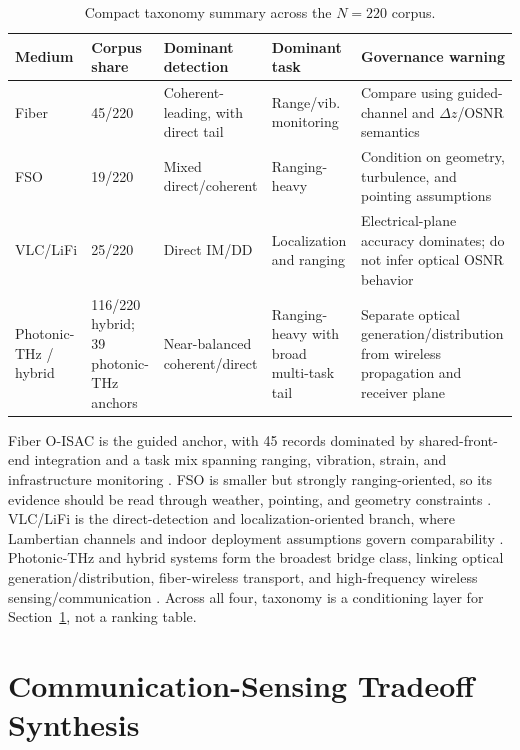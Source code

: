 \documentclass[letterpaper,journal]{IEEEtran}
\begin{document}
\begin{table}[!t]
    \caption{Compact taxonomy summary across the $N=220$ corpus.}
    \label{tab:taxonomy_compact}
    \centering
    \scriptsize
    \setlength{\tabcolsep}{2.7pt}
    \renewcommand{\arraystretch}{1.08}
    \begin{tabularx}{\textwidth}{@{}p{2.0cm}p{1.65cm}p{2.25cm}p{2.2cm}X@{}}
        \toprule
        Medium & Corpus share & Dominant detection & Dominant task & Governance warning \\
        \midrule
        Fiber & 45/220 & Coherent-leading, with direct tail & Range/vib. monitoring & Compare using guided-channel and $\Delta z$/OSNR semantics \\
        FSO & 19/220 & Mixed direct/coherent & Ranging-heavy & Condition on geometry, turbulence, and pointing assumptions \\
        VLC/LiFi & 25/220 & Direct IM/DD & Localization and ranging & Electrical-plane accuracy dominates; do not infer optical OSNR behavior \\
        Photonic-THz / hybrid & 116/220 hybrid; 39 photonic-THz anchors & Near-balanced coherent/direct & Ranging-heavy with broad multi-task tail & Separate optical generation/distribution from wireless propagation and receiver plane \\
        \bottomrule
    \end{tabularx}
\end{table}

Fiber O-ISAC is the guided anchor, with 45 records dominated by shared-front-end integration and a task mix spanning ranging, vibration, strain, and infrastructure monitoring \cite{O_ISAC_006,O_ISAC_041,O_ISAC_046}. FSO is smaller but strongly ranging-oriented, so its evidence should be read through weather, pointing, and geometry constraints \cite{O_ISAC_023,O_ISAC_035}. VLC/LiFi is the direct-detection and localization-oriented branch, where Lambertian channels and indoor deployment assumptions govern comparability \cite{O_ISAC_009,O_ISAC_039,O_ISAC_068}. Photonic-THz and hybrid systems form the broadest bridge class, linking optical generation/distribution, fiber-wireless transport, and high-frequency wireless sensing/communication \cite{O_ISAC_029,O_ISAC_070,O_ISAC_077,O_ISAC_105}. Across all four, taxonomy is a conditioning layer for Section~\ref{sec:tradeoff}, not a ranking table.

\section{Communication-Sensing Tradeoff Synthesis}
\label{sec:tradeoff}
\end{document}
